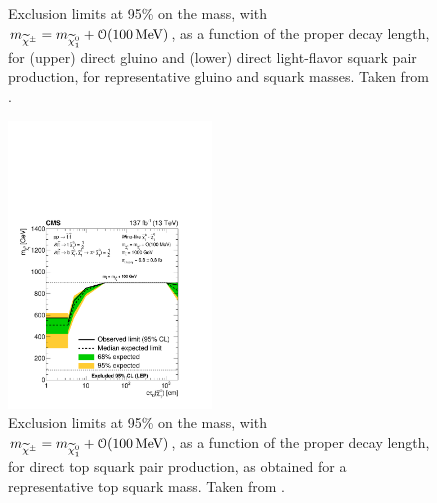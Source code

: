\begin{figure}[htbp]
    \caption[Exclusion limits at 95\% \CL on the \lsp mass as a function of \chargino proper decay length for gluino pair production and decay to light quarks, and light squark pair production, in the disappearing tracks search.]
      {Exclusion limits at 95\% \CL on the \lsp mass, with $m_{\widetilde{\chi}^\pm}=m_{\widetilde{\chi}^{0}_{1}}+\mathcal{O}(100\,\text{Me\hspace{-.08em}V})$, as a function of the \chargino proper decay length,
      for (upper) direct gluino and (lower) direct light-flavor squark pair production, for representative gluino and squark masses. Taken from \cite{MT2_2019}.}
    \label{fig:limits1fixedmass}
  \end{figure}
  
  \begin{figure}[htb!]
    \centering
    \includegraphics[width=0.48\textwidth]{figures/MT2_2019/Figure_021}
    \caption[Exclusion limits at 95\% \CL on the \lsp mass as a function of \chargino proper decay length for top squark pair production, in the disappearing tracks search.]
      {Exclusion limits at  95\% \CL on the \lsp mass, with $m_{\widetilde{\chi}^\pm}=m_{\widetilde{\chi}^{0}_{1}}+\mathcal{O}(100\,\text{Me\hspace{-.08em}V})$, as a function of the \chargino proper decay length,
      for direct top squark pair production, as obtained for a representative top squark mass. Taken from \cite{MT2_2019}.}
    \label{fig:limits1fixedmass_stop}
  \end{figure}
  
